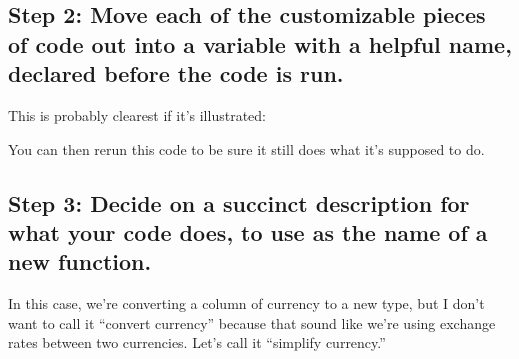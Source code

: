 \documentclass[letterpaper,10pt,english]{sphinxmanual}
\begin{document}
\subsection{Step 2:  Move each of the customizable pieces of code out into a variable with a helpful name, declared before the code is run.}
\label{\detokenize{chapter-7-abstraction:step-2-move-each-of-the-customizable-pieces-of-code-out-into-a-variable-with-a-helpful-name-declared-before-the-code-is-run}}
This is probably clearest if it’s illustrated:

\begin{sphinxVerbatim}[commandchars=\\\{\}]
  
  
\PYG{p}{[}\PYG{p}{]}  \PYG{p}{[}\PYG{p}{]}    
\PYG{p}{[}\PYG{p}{]}  \PYG{p}{[}\PYG{p}{]}    
\PYG{p}{[}\PYG{p}{]}  \PYG{p}{[}\PYG{p}{]}  
\end{sphinxVerbatim}

You can then re\sphinxhyphen{}run this code to be sure it still does what it’s supposed to do.


\subsection{Step 3:  Decide on a succinct description for what your code does, to use as the name of a new function.}
\label{\detokenize{chapter-7-abstraction:step-3-decide-on-a-succinct-description-for-what-your-code-does-to-use-as-the-name-of-a-new-function}}
In this case, we’re converting a column of currency to a new type, but I don’t want to call it “convert currency” because that sound like we’re using exchange rates between two currencies.  Let’s call it “simplify currency.”
\end{document}

